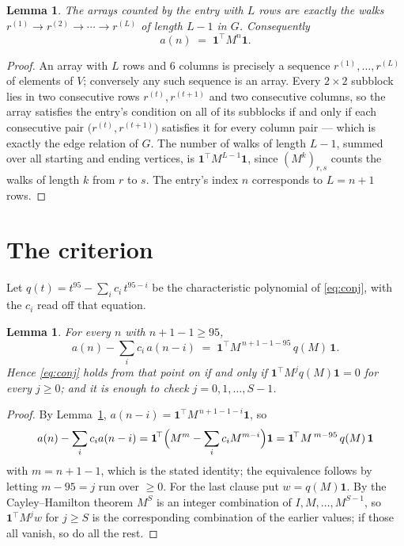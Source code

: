 \documentclass[11pt,a4paper]{article}
\theoremstyle{plain}
\newtheorem{lemma}[theorem]{Lemma}
\theoremstyle{definition}
\begin{document}
\begin{lemma}\label{lem:walk}
The arrays counted by the entry with $L$ rows are exactly the walks
$r^{(1)}\to r^{(2)}\to\cdots\to r^{(L)}$ of length $L-1$ in $G$. Consequently
\[
a(n)\;=\;\mathbf{1}^{\!\top}M^{n}\mathbf{1} .
\]
\end{lemma}

\begin{proof}
An array with $L$ rows and $6$ columns is precisely a sequence
$r^{(1)},\dots,r^{(L)}$ of elements of $V$; conversely any such sequence is an array.
Every $2\times2$ subblock lies in two consecutive rows $r^{(t)},r^{(t+1)}$ and two
consecutive columns, so the array satisfies the entry's condition on all of its subblocks
if and only if each consecutive pair $\bigl(r^{(t)},r^{(t+1)}\bigr)$ satisfies it for
every column pair --- which is exactly the edge relation of $G$. The number of walks of
length $L-1$, summed over all starting and ending vertices, is
$\mathbf{1}^{\!\top}M^{L-1}\mathbf{1}$, since $(M^{k})_{r,s}$ counts the walks of
length $k$ from $r$ to $s$. The entry's index $n$ corresponds to $L=n+1$ rows.
\end{proof}

\section{The criterion}

Let $q(t)=t^{95}-\sum_i c_i\,t^{95-i}$ be the characteristic polynomial of
\eqref{eq:conj}, with the $c_i$ read off that equation.

\begin{lemma}\label{lem:crit}
For every $n$ with $n+1-1\ge95$,
\[
a(n)-\sum_i c_i\,a(n-i)\;=\;\mathbf{1}^{\!\top}M^{\,n+1-1-95}\,q(M)\,\mathbf{1} .
\]
Hence \eqref{eq:conj} holds from that point on if and only if
$\mathbf{1}^{\!\top}M^{j}q(M)\mathbf{1}=0$ for every $j\ge0$; and it is enough to check
$j=0,1,\dots,S-1$.
\end{lemma}

\begin{proof}
By Lemma~\ref{lem:walk}, $a(n-i)=\mathbf{1}^{\!\top}M^{\,n+1-1-i}\mathbf{1}$, so
\[
a(n)-\sum_i c_i a(n-i)
=\mathbf{1}^{\!\top}\Bigl(M^{m}-\sum_i c_i M^{m-i}\Bigr)\mathbf{1}
=\mathbf{1}^{\!\top}M^{\,m-95}\,q(M)\,\mathbf{1}
\]
with $m=n+1-1$, which is the stated identity; the equivalence follows by letting
$m-95=j$ run over $\ge0$. For the last clause put $w=q(M)\mathbf{1}$. By the
Cayley--Hamilton theorem $M^{S}$ is an integer combination of $I,M,\dots,M^{S-1}$, so
$\mathbf{1}^{\!\top}M^{j}w$ for $j\ge S$ is the corresponding combination of the earlier
values; if those all vanish, so do all the rest.
\end{proof}
\end{document}
